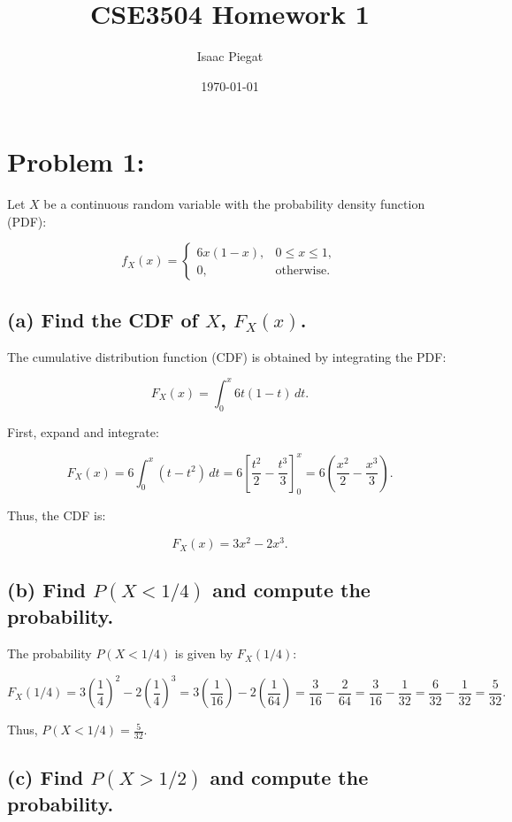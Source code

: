 \documentclass{article} %
\title{CSE3504 Homework 1} %
\author{Isaac Piegat} %
\date{\today} %
\begin{document}
\maketitle %



\section{Problem 1:}
Let \( X \) be a continuous random variable with the probability density function (PDF):

\[
f_X(x) = 
\begin{cases}
6x(1 - x), & 0 \leq x \leq 1, \\
0, & \text{otherwise}.
\end{cases}
\]

\subsection*{(a) Find the CDF of \( X \), \( F_X(x) \).}

The cumulative distribution function (CDF) is obtained by integrating the PDF:

\[
F_X(x) = \int_{0}^{x} 6t(1 - t) \, dt.
\]

First, expand and integrate:

\[
F_X(x) = 6 \int_{0}^{x} (t - t^2) \, dt
= 6 \left[ \frac{t^2}{2} - \frac{t^3}{3} \right]_0^x
= 6 \left( \frac{x^2}{2} - \frac{x^3}{3} \right).
\]

Thus, the CDF is:

\[
F_X(x) = 3x^2 - 2x^3.
\]

\subsection*{(b) Find \( P(X < 1/4) \) and compute the probability.}

The probability \( P(X < 1/4) \) is given by \( F_X(1/4) \):

\[
F_X(1/4) = 3\left( \frac{1}{4} \right)^2 - 2\left( \frac{1}{4} \right)^3
= 3\left( \frac{1}{16} \right) - 2\left( \frac{1}{64} \right)
= \frac{3}{16} - \frac{2}{64}
= \frac{3}{16} - \frac{1}{32}
= \frac{6}{32} - \frac{1}{32}
= \frac{5}{32}.
\]

Thus, \( P(X < 1/4) = \frac{5}{32} \).

\subsection*{(c) Find \( P(X > 1/2) \) and compute the probability.}
\end{document}
